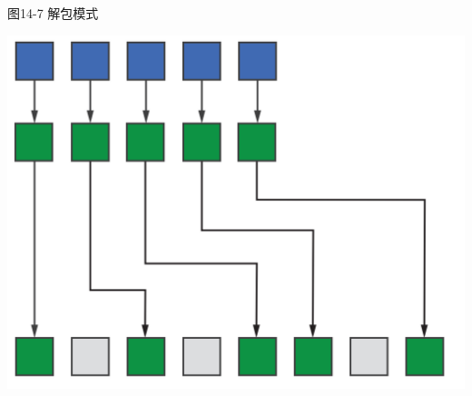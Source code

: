 \hspace*{\fill} \par %
图14-7 解包模式
\begin{center}
	\includegraphics[width=1.\textwidth]{content/chapter-14/images/7}
\end{center}


















